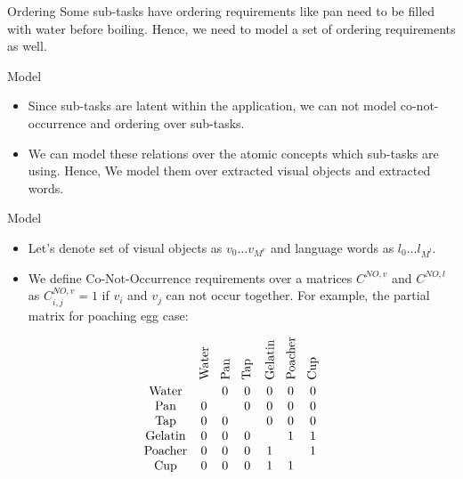 \begin{frame}{Ordering}
Some sub-tasks have ordering requirements like pan need to be filled with water before boiling. Hence, we need to model a set of ordering requirements as well.
\end{frame}

\begin{frame}{Model}
\begin{itemize}
\item Since sub-tasks are latent within the application, we can not model co-not-occurrence and ordering over sub-tasks.
\item We can model these relations over the atomic concepts which sub-tasks are using. Hence, We model them over extracted visual objects and extracted words.
\end{itemize}
\end{frame}


\begin{frame}{Model}
\begin{itemize}
\item Let's denote set of visual objects as $v_0 \ldots v_{M^v}$ and language words as $l_0 \ldots l_{M^l}$.
\item We define Co-Not-Occurrence requirements over a matrices $C^{NO,v}$ and $C^{NO,l}$ as $C^{NO,v}_{i,j} =1$ if $v_i$ and $v_j$ can not occur together. For example, the partial matrix for poaching egg case:
\end{itemize}
\[
 \begin{array}{ccccccc}
&\rotatebox{90}{Water} & \rotatebox{90}{Pan} & \rotatebox{90}{Tap} & \rotatebox{90}{Gelatin} & \rotatebox{90}{Poacher} & \rotatebox{90}{Cup} \\
\text{Water} &  & 0 & 0 & 0 & 0 & 0 \\
\text{Pan} & 0 &  & 0 & 0 & 0 & 0 \\
\text{Tap} & 0 & 0 &  & 0 & 0 & 0 \\
\text{Gelatin} & 0 & 0 & 0 &  & 1 & 1 \\
\text{Poacher} & 0 & 0 & 0 & 1 &  & 1 \\
\text{Cup} & 0 & 0 & 0 & 1 & 1 &
\end{array}
\]
\end{frame}

